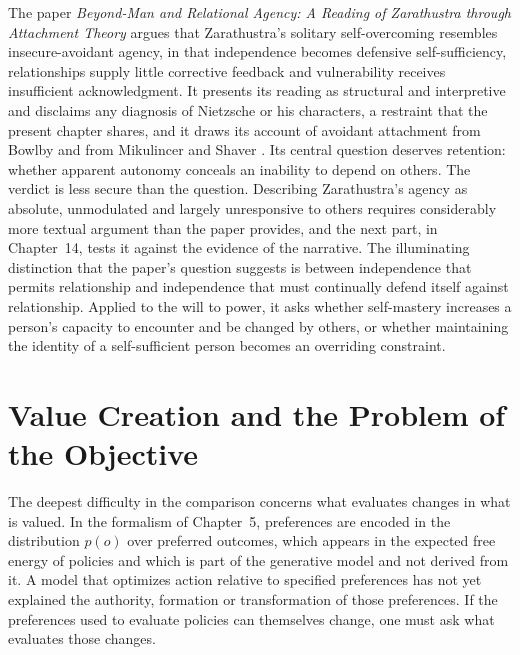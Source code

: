 The paper \emph{Beyond-Man and Relational Agency: A Reading of Zarathustra through Attachment Theory} \citep{ferrari} argues that Zarathustra's solitary self-overcoming resembles insecure-avoidant agency, in that independence becomes defensive self-sufficiency, relationships supply little corrective feedback and vulnerability receives insufficient acknowledgment. It presents its reading as structural and interpretive and disclaims any diagnosis of Nietzsche or his characters, a restraint that the present chapter shares, and it draws its account of avoidant attachment from Bowlby and from Mikulincer and Shaver \citep{mikulincer2007}. Its central question deserves retention: whether apparent autonomy conceals an inability to depend on others. The verdict is less secure than the question. Describing Zarathustra's agency as absolute, unmodulated and largely unresponsive to others requires considerably more textual argument than the paper provides, and the next part, in Chapter~14, tests it against the evidence of the narrative. The illuminating distinction that the paper's question suggests is between independence that permits relationship and independence that must continually defend itself against relationship. Applied to the will to power, it asks whether self-mastery increases a person's capacity to encounter and be changed by others, or whether maintaining the identity of a self-sufficient person becomes an overriding constraint.

\chapter{Value Creation and the Problem of the Objective}

The deepest difficulty in the comparison concerns what evaluates changes in what is valued. In the formalism of Chapter~5, preferences are encoded in the distribution $p(o)$ over preferred outcomes, which appears in the expected free energy of policies and which is part of the generative model and not derived from it. A model that optimizes action relative to specified preferences has not yet explained the authority, formation or transformation of those preferences. If the preferences used to evaluate policies can themselves change, one must ask what evaluates those changes.

